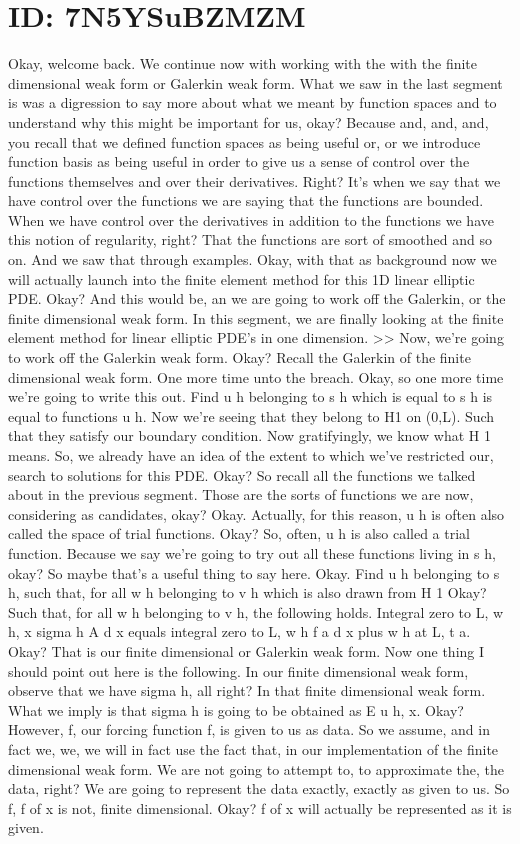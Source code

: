 \documentclass[10pt]{article}
\begin{document}
\section*{ID: 7N5YSuBZMZM}
Okay, welcome back. We continue now with working with the with the finite dimensional weak form or Galerkin weak form. What we saw in the last segment is was a digression to say more about what we meant by function spaces and to understand why this might be important for us, okay? Because and, and, and, you recall that we defined function spaces as being useful or, or we introduce function basis as being useful in order to give us a sense of control over the functions themselves and over their derivatives. Right? It's when we say that we have control over the functions we are saying that the functions are bounded. When we have control over the derivatives in addition to the functions we have this notion of regularity, right? That the functions are sort of smoothed and so on. And we saw that through examples. Okay, with that as background now we will actually launch into the finite element method for this 1D linear elliptic PDE. Okay? And this would be, an we are going to work off the Galerkin, or the finite dimensional weak form. In this segment, we are finally looking at the finite element method for linear elliptic PDE's in one dimension. >> Now, we're going to work off the Galerkin weak form. Okay? Recall the Galerkin of the finite dimensional weak form. One more time unto the breach. Okay, so one more time we're going to write this out. Find u h belonging to s h which is equal to s h is equal to functions u h. Now we're seeing that they belong to H1 on (0,L). Such that they satisfy our boundary condition. Now gratifyingly, we know what H 1 means. So, we already have an idea of the extent to which we've restricted our, search to solutions for this PDE. Okay? So recall all the functions we talked about in the previous segment. Those are the sorts of functions we are now, considering as candidates, okay? Okay. Actually, for this reason, u h is often also called the space of trial functions. Okay? So, often, u h is also called a trial function. Because we say we're going to try out all these functions living in s h, okay? So maybe that's a useful thing to say here. Okay. Find u h belonging to s h, such that, for all w h belonging to v h which is also drawn from H 1 Okay? Such that, for all w h belonging to v h, the following holds. Integral zero to L, w h, x sigma h A d x equals integral zero to L, w h f a d x plus w h at L, t a. Okay? That is our finite dimensional or Galerkin weak form. Now one thing I should point out here is the following. In our finite dimensional weak form, observe that we have sigma h, all right? In that finite dimensional weak form. What we imply is that sigma h is going to be obtained as E u h, x. Okay? However, f, our forcing function f, is given to us as data. So we assume, and in fact we, we, we will in fact use the fact that, in our implementation of the finite dimensional weak form. We are not going to attempt to, to approximate the, the data, right? We are going to represent the data exactly, exactly as given to us. So f, f of x is not, finite dimensional. Okay? f of x will actually be represented as it is given. 
\end{document}
